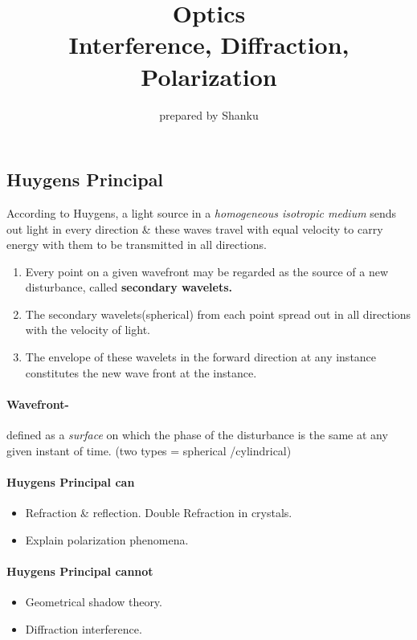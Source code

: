 \documentclass[legalpaper,10pt]{article}
\title{\textbf{\LARGE{Optics}} \\ Interference,  Diffraction, Polarization}
\author{prepared by Shanku}
\begin{document}
\maketitle
\begin{multicols*}{2}

	\section*{Huygens Principal}
	According to Huygens, a light source in a \textit{homogeneous isotropic medium} sends out light in every direction \& these waves travel with equal velocity to carry energy with them to be transmitted in all directions.
	\begin{enumerate}
		\item {Every point on a given wavefront may be regarded as the source of a new disturbance, called \bf{secondary wavelets.}}
		\item The secondary wavelets(spherical) from each point spread out in all directions with the velocity of light.
		\item The envelope of these wavelets in the forward direction at any instance constitutes the new wave front at the instance.
	\end{enumerate}
	\paragraph{Wavefront-}defined as a \textit{surface} on which the phase of the disturbance is the same at any given instant of time. (two types = spherical /cylindrical)
	\paragraph{Huygens Principal can}
	\begin{itemize}
		\item Refraction \& reflection. Double Refraction in crystals.
		\item Explain polarization phenomena.
	\end{itemize}
	\paragraph{Huygens Principal cannot}
	\begin{itemize}
		\item Geometrical shadow theory.
		\item Diffraction interference.
	\end{itemize}


\end{multicols*}
\end{document}
